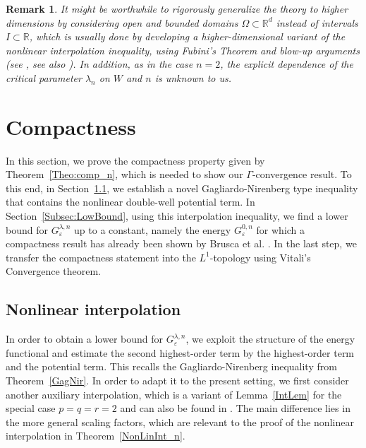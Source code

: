 \documentclass{article}
\newcommand{\lam}{\lambda}
\newcommand{\eps}{\varepsilon}
\numberwithin{figure}{section}
\newcommand{\R}{\mathbb{R}}
\newtheorem{rem}[theorem]{Remark}
\numberwithin{equation}{section}
\begin{document}
\begin{rem}
It might be worthwhile to rigorously generalize the theory to higher dimensions by considering open and bounded domains $\Omega \subset \R^d$ instead of intervals $I \subset \R$, which is usually done by developing a higher-dimensional variant of the nonlinear interpolation inequality, using Fubini's Theorem and blow-up arguments (see \cite{CheDalFonLeo}, see also \cite{brai}). In addition, as in the case $n = 2$, the explicit dependence of the critical parameter $\lam_n$ on $W$ and $n$ is unknown to us.
\end{rem}



\section{Compactness} \label{Sec:Compact}

In this section, we prove the compactness property given by Theorem~\ref{Theo:comp_n}, which is needed to show our $\Gamma$-convergence result. To this end, in Section~\ref{Subsec:NonLin}, we establish a novel Gagliardo-Nirenberg type inequality that contains the nonlinear double-well potential term. In Section~\ref{Subsec:LowBound}, using this interpolation inequality, we find a lower bound for $G_\eps^{\lam,n}$ up to a constant, namely the energy $G_\eps^{0,n}$ for which a compactness result has already been shown by Brusca et al. \cite{BruDonSol}. In the last step, we transfer the compactness statement into the $L^1$-topology using Vitali's Convergence theorem.



\subsection{Nonlinear interpolation} \label{Subsec:NonLin}

In order to obtain a lower bound for $G_\eps^{\lam,n}$, we exploit the structure of the energy functional and estimate the second highest-order term by the highest-order term and the potential term. This recalls the Gagliardo-Nirenberg inequality from Theorem~\ref{GagNir}. In order to adapt it  to the present setting, we first consider another auxiliary interpolation, which is a variant of Lemma~\ref{IntLem} for the special case $p=q=r=2$ and can also be found in \cite[Lemma 3.3]{CheDalFonLeo}. The main difference lies in the more general scaling factors, which are relevant to the proof of the nonlinear interpolation in Theorem~\ref{NonLinInt_n}.
\end{document}
